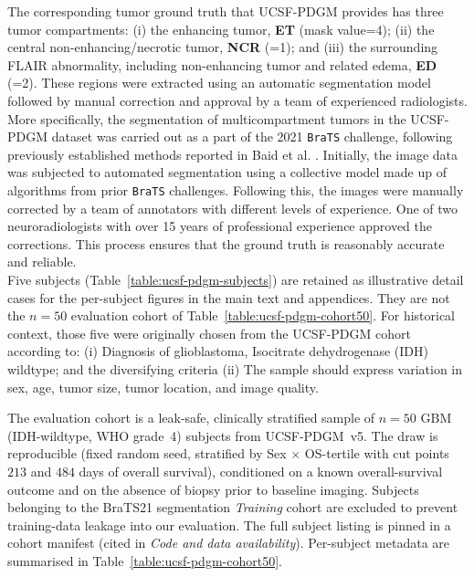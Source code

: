 \documentclass[a4paper,11pt,leqno]{article}
\begin{document}
The corresponding tumor ground truth that UCSF-PDGM provides has three
tumor compartments: (i) the enhancing tumor, \textbf{ET} (mask value=4); (ii) the central
non-enhancing/necrotic tumor, \textbf{NCR} (=1); and (iii) the
surrounding FLAIR abnormality, including non-enhancing tumor and related
edema, \textbf{ED} (=2). These regions were extracted using an automatic
segmentation model followed by manual correction and approval by a team
of experienced radiologists. More specifically, the segmentation of
multicompartment tumors in the UCSF-PDGM dataset was carried out as a
part of the 2021 \texttt{BraTS} challenge, following previously established
methods reported in Baid et al. \cite{Baid2021}.  %
Initially, the image data was
subjected to automated segmentation using a collective model made up of
algorithms from prior \texttt{BraTS} challenges. Following this, the images were
manually corrected by a team of annotators with different levels of
experience. One of two neuroradiologists with over 15 years of professional experience approved the corrections. This process ensures that
the ground truth is reasonably accurate and reliable.\\

Five subjects (Table~\ref{table:ucsf-pdgm-subjects}) are retained as illustrative detail cases for the per-subject figures in the main text and appendices. They are not the $n=50$ evaluation cohort of Table~\ref{table:ucsf-pdgm-cohort50}. For historical context, those five were originally chosen from the UCSF-PDGM cohort according to:
(i) Diagnosis of glioblastoma, Isocitrate dehydrogenase (IDH) wildtype; and the diversifying criteria
(ii) The sample should express variation in sex, age, tumor size, tumor location,
and image quality. %

The evaluation cohort is a leak-safe, clinically stratified
sample of $n=50$ GBM (IDH-wildtype, WHO grade~4) subjects from
UCSF-PDGM~v5. The draw is reproducible (fixed random seed,
stratified by Sex $\times$ OS-tertile with cut points $213$ and
$484$ days of overall survival), conditioned on a known
overall-survival outcome and on the absence of biopsy prior to
baseline imaging. Subjects belonging to the BraTS21 segmentation
\emph{Training} cohort are excluded to prevent training-data
leakage into our evaluation. The full subject listing is pinned in
a cohort manifest (cited in \emph{Code and data availability}). Per-subject metadata are summarised in
Table~\ref{table:ucsf-pdgm-cohort50}.

\begin{table}[H]
\centering

\vspace{2mm}
\caption{\textbf{Cohort summary ($n=50$, UCSF-PDGM~v5).}
Derived from the public UCSF-PDGM~v5 metadata. OS = overall
survival in days; EOR = extent of resection (GTR = gross total
resection, STR = subtotal resection). The BraTS21 segmentation
cohort row confirms zero subjects from BraTS21 \emph{Training},
i.e.\ no leakage into our evaluation set.}
\label{table:ucsf-pdgm-cohort50}
\end{table}
\end{document}
